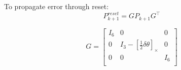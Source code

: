 \documentclass[]{article}
\begin{document}
To propagate error through reset:
\[P_{k+1}^{reset} = G P_{k+1} G^{\intercal}\] 

\[G = 
\begin{bmatrix}
I_6  &    0                                        & 0   \\
  0  & I_3 - [\frac{1}{2} \delta \theta]_{\times}  & 0  \\
  0  &    0                                        & I_6  \\
\end{bmatrix}
\]
\end{document}
